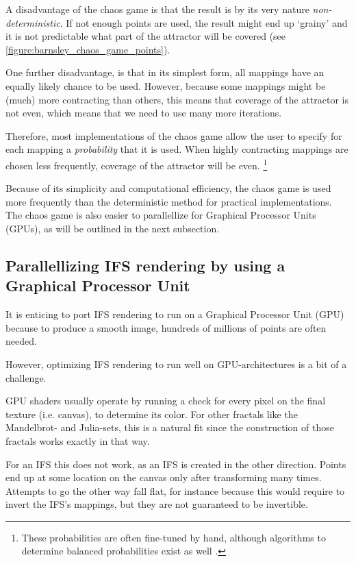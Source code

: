 \documentclass[11pt]{article}
\newcommand*{\altasterism}{\vspace*{1em plus .5em minus .5em}\noindent\hspace*{\fill}\ding{104}\hspace*{\fill}}
\begin{document}
A disadvantage of the chaos game is that the result is by its very nature \emph{non-deterministic}.
If not enough points are used, the result might end up `grainy' and it is not predictable what part of the attractor will be covered (see \autoref{figure:barnsley_chaos_game_points}).

One further disadvantage, is that in its simplest form, all mappings have an equally likely chance to be used.
However, because some mappings might be (much) more contracting than others, this means that coverage of the attractor is not even,
which means that we need to use many more iterations.

Therefore, most implementations of the chaos game allow the user to specify for each mapping a \emph{probability} that it is used. 
When highly contracting mappings are chosen less frequently, coverage of the attractor will be even. \footnote{These probabilities are often fine-tuned by hand, although algorithms to determine balanced probabilities exist as well \cite{hepting1991rendering}.}

\altasterism

Because of its simplicity and computational efficiency, the chaos game is used more frequently than the deterministic method for practical implementations.
The chaos game is also easier to parallellize for Graphical Processor Units (GPUs), as will be outlined in the next subsection.

\subsection{Parallellizing IFS rendering by using a Graphical Processor Unit}
\label{sec:orge96706e}

It is enticing to port IFS rendering to run on a Graphical Processor Unit (GPU) because to produce a smooth image, hundreds of millions of points are often needed.

However, optimizing IFS rendering to run well on GPU-architectures is a bit of a challenge.

GPU shaders usually operate by running a check for every pixel on the final texture (i.e. canvas), to determine its color.
For other fractals like the Mandelbrot- and Julia-sets, this is a natural fit since the construction of those fractals works exactly in that way.

For an IFS this does not work, as an IFS is created in the other direction. Points end up at some location on the canvas only after transforming many times.
Attempts to go the other way fall flat, for instance because this would require to invert the IFS's mappings, but they are not guaranteed to be invertible.
\end{document}
